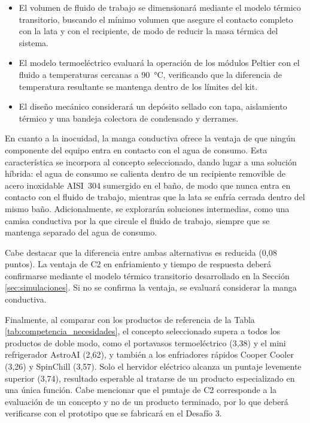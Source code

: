 \documentclass[12pt, a4paper]{article}
\begin{document}
\begin{itemize}
    \item El volumen de fluido de trabajo se dimensionará mediante el modelo térmico transitorio, buscando el mínimo volumen que asegure el contacto completo con la lata y con el recipiente, de modo de reducir la masa térmica del sistema.
    \item El modelo termoeléctrico evaluará la operación de los módulos Peltier con el fluido a temperaturas cercanas a \SI{90}{\celsius}, verificando que la diferencia de temperatura resultante se mantenga dentro de los límites del kit.
    \item El diseño mecánico considerará un depósito sellado con tapa, aislamiento térmico y una bandeja colectora de condensado y derrames.
\end{itemize}

En cuanto a la inocuidad, la manga conductiva ofrece la ventaja de que ningún componente del equipo entra en contacto con el agua de consumo. Esta característica se incorpora al concepto seleccionado, dando lugar a una solución híbrida: el agua de consumo se calienta dentro de un recipiente removible de acero inoxidable AISI~304 sumergido en el baño, de modo que nunca entra en contacto con el fluido de trabajo, mientras que la lata se enfría cerrada dentro del mismo baño. Adicionalmente, se explorarán soluciones intermedias, como una camisa conductiva por la que circule el fluido de trabajo, siempre que se mantenga separado del agua de consumo.

Cabe destacar que la diferencia entre ambas alternativas es reducida (0,08 puntos). La ventaja de C2 en enfriamiento y tiempo de respuesta deberá confirmarse mediante el modelo térmico transitorio desarrollado en la Sección \ref{sec:simulaciones}. Si no se confirma la ventaja, se evaluará considerar la manga conductiva.

Finalmente, al comparar con los productos de referencia de la Tabla \ref{tab:competencia_necesidades}, el concepto seleccionado supera a todos los productos de doble modo, como el portavasos termoeléctrico (3,38) y el mini refrigerador AstroAI (2,62), y también a los enfriadores rápidos Cooper Cooler (3,26) y SpinChill (3,57). Solo el hervidor eléctrico alcanza un puntaje levemente superior (3,74), resultado esperable al tratarse de un producto especializado en una única función. Cabe mencionar que el puntaje de C2 corresponde a la evaluación de un concepto y no de un producto terminado, por lo que deberá verificarse con el prototipo que se fabricará en el Desafío 3.
\end{document}
